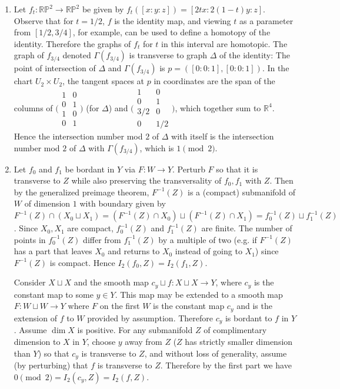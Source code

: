 \documentclass[11pt,leqno]{article}
\theoremstyle{plain}
\theoremstyle{definition}
\numberwithin{equation}{section}
\numberwithin{lem}{section}
\begin{document}
\begin{enumerate}
\begin{enumerate}
    \end{enumerate}
    \item Let $f_t\colon \mathbb {RP}^2\to \mathbb {RP}^2$ be given by $f_t([x:y:z]) = [2tx:2(1-t)y:z]$. Observe that for $t = 1/2$, $f$ is the identity map, and viewing $t$ as a parameter from $[1/2,3/4]$, for example, can be used to define a homotopy of the identity. Therefore the graphs of $f_t$ for $t$ in this interval are homotopic. The graph of $f_{3/4}$ denoted $\Gamma(f_{3/4})$ is transverse to graph $\Delta$ of the identity: The point of intersection of $\Delta$ and $\Gamma(f_{3/4})$ is $p = ([0:0:1],[0:0:1])$. In the chart $U_2\times U_2$, the tangent spaces at $p$ in coordinates are the span of the columns of $\bigg(\!\begin{smallmatrix}
        1 & 0 \\ 0 & 1 \\ 1 & 0 \\ 0 & 1
    \end{smallmatrix}\!\bigg)$ (for $\Delta$) and $\bigg(\!\begin{smallmatrix}
        1 & 0 \\ 0 & 1 \\ 3/2 & 0 \\ 0 & 1/2
    \end{smallmatrix}\!\bigg)$, which together sum to $\mathbb R^4$. Hence the intersection number mod $2$ of $\Delta$ with itself is the intersection number mod $2$ of $\Delta$ with $\Gamma(f_{3/4})$, which is $1\pmod 2$.
    \item Let $f_0$ and $f_1$ be bordant in $Y$ via $F\colon W\to Y$. Perturb $F$ so that it is transverse to $Z$ while also preserving the transversality of $f_0,f_1$ with $Z$. Then by the generalized preimage theorem, $F^{-1}(Z)$ is a (compact) submanifold of $W$ of dimension $1$ with boundary given by $F^{-1}(Z)\cap (X_0\sqcup X_1) = (F^{-1}(Z)\cap X_0)\sqcup (F^{-1}(Z)\cap X_1) = f_0^{-1}(Z)\sqcup f_1^{-1}(Z)$. Since $X_0,X_1$ are compact, $f_0^{-1}(Z)$ and $f_1^{-1}(Z)$ are finite. The number of points in $f_0^{-1}(Z)$ differ from $f_1^{-1}(Z)$ by a multiple of two (e.g. if $F^{-1}(Z)$ has a part that leaves $X_0$ and returns to $X_0$ instead of going to $X_1$) since $F^{-1}(Z)$ is compact. Hence $I_2(f_0,Z) = I_2(f_1,Z)$.
    
    Consider $X\sqcup X$ and the smooth map $c_y\sqcup f: X\sqcup X\to Y$, where $c_y$ is the constant map to some $y\in Y$. This map may be extended to a smooth map $F\colon W\sqcup W\to Y$ where $F$ on the first $W$ is the constant map $c_y$ and is the extension of $f$ to $W$ provided by assumption. Therefore $c_y$ is bordant to $f$ in $Y$. Assume $\dim X$ is positive. For any submanifold $Z$ of complimentary dimension to $X$ in $Y$, choose $y$ away from $Z$ ($Z$ has strictly smaller dimension than $Y$) so that $c_y$ is transverse to $Z$, and without loss of generality, assume (by perturbing) that $f$ is transverse to $Z$. Therefore by the first part we have $0 \pmod 2 = I_2(c_y, Z) = I_2(f,Z)$.


\end{enumerate}
\end{document}
